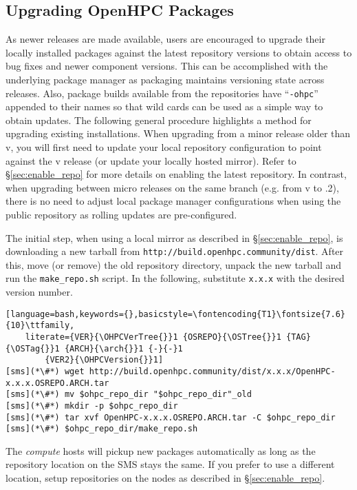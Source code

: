 \subsection{Upgrading OpenHPC Packages}  \label{appendix:upgrade}


As newer \OHPC{} releases are made available, users are encouraged to upgrade
their locally installed packages against the latest repository versions to
obtain access to bug fixes and newer component versions. This can be
accomplished with the underlying package manager as \OHPC{} packaging maintains
versioning state across releases. Also, package builds available from the
\OHPC{} repositories have ``\texttt{-ohpc}'' appended to their names so that
wild cards can be used as a simple way to obtain updates. The following general
procedure highlights a method for upgrading existing installations.
When upgrading from a minor release older than v\OHPCVerTree{}, you will first
need to update your local \OHPC{} repository configuration to point against the
v\OHPCVerTree{} release (or update your locally hosted mirror). Refer to
\S\ref{sec:enable_repo} for more details on enabling the latest
repository. In contrast, when upgrading between micro releases on the same
branch (e.g. from v\OHPCVerTree{} to \OHPCVerTree{}.2), there is no need to
adjust local package manager configurations when using the public repository as
rolling updates are pre-configured.
 
The initial step, when using a local mirror as described in
\S\ref{sec:enable_repo}, is downloading a new tarball from \texttt{http://build.openhpc.community/dist}. 
After this, move (or remove) the old repository directory, unpack
the new tarball and run the \texttt{make\_repo.sh} script. In the following,
substitute \texttt{x.x.x} with the desired version number. 

\begin{lstlisting}[language=bash,keywords={},basicstyle=\fontencoding{T1}\fontsize{7.6}{10}\ttfamily,
	literate={VER}{\OHPCVerTree{}}1 {OSREPO}{\OSTree{}}1 {TAG}{\OSTag{}}1 {ARCH}{\arch{}}1 {-}{-}1 
        {VER2}{\OHPCVersion{}}1]
[sms](*\#*) wget http://build.openhpc.community/dist/x.x.x/OpenHPC-x.x.x.OSREPO.ARCH.tar
[sms](*\#*) mv $ohpc_repo_dir "$ohpc_repo_dir"_old
[sms](*\#*) mkdir -p $ohpc_repo_dir
[sms](*\#*) tar xvf OpenHPC-x.x.x.OSREPO.ARCH.tar -C $ohpc_repo_dir
[sms](*\#*) $ohpc_repo_dir/make_repo.sh
\end{lstlisting}

The {\em compute} hosts will pickup new packages automatically as long as the
repository location on the SMS stays the same. If you prefer to use a different
location, setup repositories on the nodes as described in
\S\ref{sec:enable_repo}.

